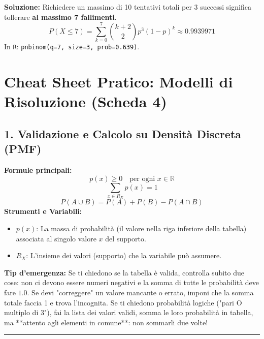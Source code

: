 \documentclass[12pt, a4paper]{article}
\begin{document}
\textbf{Soluzione:}
Richiedere un massimo di 10 tentativi totali per 3 successi significa tollerare \textbf{al massimo 7 fallimenti}.
$$ P(X \le 7) = \sum_{k=0}^{7} \binom{k+2}{2} p^3 (1-p)^k \approx 0.9939971 $$
In \texttt{R}: \texttt{pnbinom(q=7, size=3, prob=0.639)}.


\section*{Cheat Sheet Pratico: Modelli di Risoluzione (Scheda 4)}

\subsection*{1. Validazione e Calcolo su Densità Discreta (PMF)}
\textbf{Formule principali:}
$$ p(x) \ge 0 \quad \text{per ogni } x \in \mathbb{R} $$
$$ \sum_{x \in R_X} p(x) = 1 $$
$$ P(A \cup B) = P(A) + P(B) - P(A \cap B) $$
\textbf{Strumenti e Variabili:}
\begin{itemize}
    \item $p(x)$: La massa di probabilità (il valore nella riga inferiore della tabella) associata al singolo valore $x$ del supporto.
    \item $R_X$: L'insieme dei valori (supporto) che la variabile può assumere.
\end{itemize}
\textbf{Tip d'emergenza:} Se ti chiedono se la tabella è valida, controlla subito due cose: non ci devono essere numeri negativi e la somma di tutte le probabilità deve fare $1.0$. Se devi "correggere" un valore mancante o errato, imponi che la somma totale faccia 1 e trova l'incognita. Se ti chiedono probabilità logiche ("pari O multiplo di 3"), fai la lista dei valori validi, somma le loro probabilità in tabella, ma **attento agli elementi in comune**: non sommarli due volte!

\vspace{0.3cm}\hrule\vspace{0.3cm}

\end{document}
